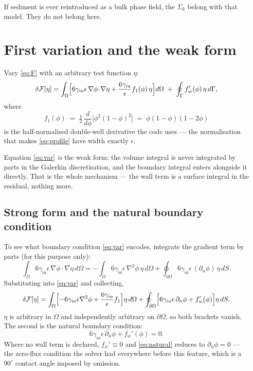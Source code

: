 \documentclass[11pt,a4paper]{article}
\newcommand{\sia}{\gamma_{ia}}
\newcommand{\eps}{\epsilon}
\newcommand{\dn}{\partial_n}
\begin{document}
If sediment is ever reintroduced as a bulk phase field, the $\Sigma_k$ belong
with that model. They do not belong here.

\section{First variation and the weak form}

Vary \eqref{eq:F} with an arbitrary test function $\eta$:
\begin{equation}
\delta\mathcal{F}[\eta]
=\int_\Omega\Bigl[6\sia\eps\,\nabla\phi\!\cdot\!\nabla\eta
+\frac{6\sia}{\eps}f_1(\phi)\,\eta\Bigr]d\Omega
\;+\;\oint_\Gamma f_w'(\phi)\,\eta\,d\Gamma ,
\label{eq:var}
\end{equation}
where
\begin{equation}
f_1(\phi)\;=\;\tfrac12\,\frac{d}{d\phi}\bigl[\phi^{2}(1-\phi)^{2}\bigr]
\;=\;\phi(1-\phi)(1-2\phi)
\end{equation}
is the half-normalised double-well derivative the code uses --- the
normalisation that makes \eqref{eq:profile} have width exactly $\eps$.

Equation \eqref{eq:var} \emph{is} the weak form: the volume integral is never
integrated by parts in the Galerkin discretisation, and the boundary integral
enters alongside it directly. That is the whole mechanism --- the wall term is a
surface integral in the residual, nothing more.

\subsection{Strong form and the natural boundary condition}\label{sec:bc}

To see what boundary condition \eqref{eq:var} encodes, integrate the gradient
term by parts (for this purpose only):
\begin{equation}
\int_\Omega 6\sia\eps\,\nabla\phi\!\cdot\!\nabla\eta\,d\Omega
=-\int_\Omega 6\sia\eps\,\nabla^{2}\phi\,\eta\,d\Omega
+\oint_{\partial\Omega}6\sia\eps\,(\dn\phi)\,\eta\,dS .
\end{equation}
Substituting into \eqref{eq:var} and collecting,
\begin{equation}
\delta\mathcal{F}[\eta]
=\int_\Omega\Bigl[-6\sia\eps\nabla^{2}\phi+\frac{6\sia}{\eps}f_1\Bigr]\eta\,d\Omega
+\oint_{\partial\Omega}\Bigl[6\sia\eps\,\dn\phi+f_w'(\phi)\Bigr]\eta\,dS .
\end{equation}
$\eta$ is arbitrary in $\Omega$ and independently arbitrary on $\partial\Omega$,
so both brackets vanish. The second is the natural boundary condition:
\begin{equation}
6\sia\eps\,\dn\phi + f_w'(\phi) = 0 .
\label{eq:natural}
\end{equation}
Where no wall term is declared, $f_w'\equiv0$ and \eqref{eq:natural} reduces to
$\dn\phi=0$ --- the zero-flux condition the solver had everywhere before this
feature, which is a $90^\circ$ contact angle imposed by omission.
\end{document}
